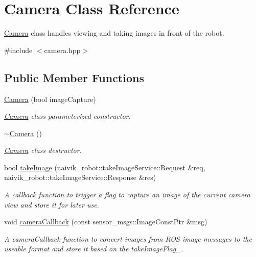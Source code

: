 \hypertarget{classCamera}{}\section{Camera Class Reference}
\label{classCamera}


\hyperlink{classCamera}{Camera} class handles viewing and taking images in front of the robot.  




{\ttfamily \#include $<$camera.\+hpp$>$}

\subsection*{Public Member Functions}
\begin{DoxyCompactItemize}
\item 
\hyperlink{classCamera_aa77cf66f19d66b36df13aac88f1a8aa3}{Camera} (bool image\+Capture)
\begin{DoxyCompactList}\small\item\em \hyperlink{classCamera}{Camera} class parameterized constructor. \end{DoxyCompactList}\item 
\hyperlink{classCamera_ad1897942d0ccf91052386388a497349f}{$\sim$\+Camera} ()
\begin{DoxyCompactList}\small\item\em \hyperlink{classCamera}{Camera} class destructor. \end{DoxyCompactList}\item 
bool \hyperlink{classCamera_a41a379dab8dd9b7946754bcc7d792c3e}{take\+Image} (naivik\+\_\+robot\+::take\+Image\+Service\+::\+Request \&req, naivik\+\_\+robot\+::take\+Image\+Service\+::\+Response \&res)
\begin{DoxyCompactList}\small\item\em A callback function to trigger a flag to capture an image of the current camera view and store it for later use. \end{DoxyCompactList}\item 
void \hyperlink{classCamera_aff57f8419ee9de1262592171a84ddf8d}{camera\+Callback} (const sensor\+\_\+msgs\+::\+Image\+Const\+Ptr \&msg)
\begin{DoxyCompactList}\small\item\em A camera\+Callback function to convert images from R\+OS image messages to the useable format and store it based on the take\+Image\+Flag\+\_\+. \end{DoxyCompactList}\end{DoxyCompactItemize}
